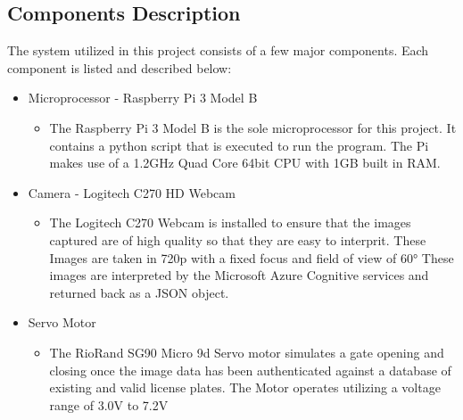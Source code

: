 \documentclass[12pt]{article}
\begin{document}
\subsection{Components Description}
The system utilized in this project consists of a few major components. Each component is listed and described below:
\begin{itemize}
\item Microprocessor - Raspberry Pi 3 Model B
\begin{itemize}
    \item The Raspberry Pi 3 Model B is the sole microprocessor for this project. It contains a python script that is executed to run the program. The Pi makes use of  a 1.2GHz Quad Core 64bit CPU with 1GB built in RAM.
\end{itemize} 
\item Camera - Logitech C270 HD Webcam
\begin{itemize}
    \item The Logitech C270 Webcam is installed to ensure that the images captured are of high quality so that they are easy to interprit. These Images are taken in 720p with a fixed focus and field of view of \ang{60} These images are interpreted by the Microsoft Azure Cognitive services and returned back as a JSON object.
\end{itemize}
\item Servo Motor
\begin{itemize}
    \item The RioRand SG90 Micro 9d Servo motor simulates a gate opening and closing once the image data has been authenticated against a database of existing and valid license plates. The Motor operates utilizing a voltage range of 3.0V to 7.2V
\end{itemize}
\end{itemize}

\newpage
\end{document}
